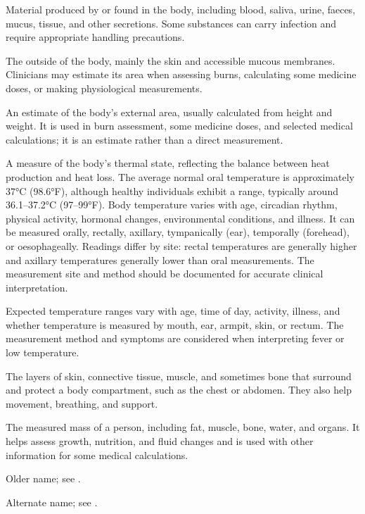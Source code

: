  Material produced by or found in the body, including blood, saliva, urine, faeces, mucus, tissue, and other secretions. Some substances can carry infection and require appropriate handling precautions.

 The outside of the body, mainly the skin and accessible mucous membranes. Clinicians may estimate its area when assessing burns, calculating some medicine doses, or making physiological measurements.

 An estimate of the body's external area, usually calculated from height and weight. It is used in burn assessment, some medicine doses, and selected medical calculations; it is an estimate rather than a direct measurement.

 A measure of the body's thermal state, reflecting the balance between
heat production and heat loss. The average normal oral temperature is approximately 37°C (98.6°F),
although healthy individuals exhibit a range, typically around 36.1–37.2°C (97–99°F). Body temperature
varies with age, circadian rhythm, physical activity, hormonal changes, environmental conditions,
and illness. It can be measured orally, rectally, axillary, tympanically (ear), temporally (forehead),
or oesophageally. Readings differ by site: rectal temperatures are generally higher and axillary
temperatures generally lower than oral measurements. The measurement site and method should be
documented for accurate clinical interpretation.

 Expected temperature ranges vary with age, time of day, activity, illness, and whether temperature is measured by mouth, ear, armpit, skin, or rectum. The measurement method and symptoms are considered when interpreting fever or low temperature.

 The layers of skin, connective tissue, muscle, and sometimes bone that surround and protect a body compartment, such as the chest or abdomen. They also help movement, breathing, and support.

 The measured mass of a person, including fat, muscle, bone, water, and organs. It helps assess growth, nutrition, and fluid changes and is used with other information for some medical calculations.

 Older name; see .

 Alternate name; see .

